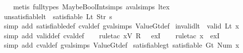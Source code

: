 \begin{isabellebody}
\ \ \isamarkupfalse%
\ {\isacharparenleft}metis\ {\isacharparenleft}full{\isacharunderscore}types{\isacharparenright}\ MaybeBoolInt{\isachardot}simps{\isacharparenleft}{}{\isacharparenright}\ aval{\isachardot}simps{\isacharparenleft}{}{\isacharparenright}\ lt{\isacharunderscore}ex{\isacharparenright}%
\endisatagproof
{\isafoldproof}%
%
\isadelimproof
\isanewline
%
\endisadelimproof
\isanewline
{}\isamarkupfalse%
\ unsatisfiable{\isacharunderscore}lt{\isacharcolon}\ {\isachardoublequoteopen}{\isasymnot}\ satisfiable\ {\isacharparenleft}Lt\ {\isacharparenleft}Str\ s{\isacharparenright}{\isacharparenright}{\isachardoublequoteclose}\isanewline
%
\isadelimproof
\ \ %
\endisadelimproof
%
\isatagproof
{}\isamarkupfalse%
\ {\isacharparenleft}simp\ add{\isacharcolon}\ satisfiable{\isacharunderscore}def\ cval{\isacharunderscore}def\ gval{\isachardot}simps\ ValueGt{\isacharunderscore}def{\isacharparenright}%
\endisatagproof
{\isafoldproof}%
%
\isadelimproof
\isanewline
%
\endisadelimproof
\isanewline
{}\isamarkupfalse%
\ invalid{\isacharunderscore}lt{\isacharcolon}\ {\isachardoublequoteopen}{\isasymnot}\ valid\ {\isacharparenleft}Lt\ x{\isacharparenright}{\isachardoublequoteclose}\isanewline
%
\isadelimproof
\ \ %
\endisadelimproof
%
\isatagproof
{}\isamarkupfalse%
\ {\isacharparenleft}simp\ add{\isacharcolon}\ valid{\isacharunderscore}def\ cval{\isacharunderscore}def{\isacharparenright}\isanewline
\ \ \isamarkupfalse%
\ {\isacharparenleft}rule{\isacharunderscore}tac\ x{\isacharequal}{\isachardoublequoteopen}V\ {\isacharparenleft}R\ {}{\isacharparenright}{\isachardoublequoteclose}\ \ exI{\isacharparenright}\isanewline
\ \ \isamarkupfalse%
\ {\isacharparenleft}rule{\isacharunderscore}tac\ x{\isacharequal}{\isachardoublequoteopen}{\isacharless}{\isachargreater}{\isachardoublequoteclose}\ \ exI{\isacharparenright}\isanewline
\ \ \isamarkupfalse%
\ {\isacharparenleft}simp\ add{\isacharcolon}\ cval{\isacharunderscore}def\ gval{\isachardot}simps\ ValueGt{\isacharunderscore}def{\isacharparenright}%
\endisatagproof
{\isafoldproof}%
%
\isadelimproof
\isanewline
%
\endisadelimproof
\isanewline
{}\isamarkupfalse%
\ satisfiable{\isacharunderscore}gt{\isacharcolon}\ {\isachardoublequoteopen}satisfiable\ {\isacharparenleft}Gt\ {\isacharparenleft}Num\ x{}{\isacharparenright}{\isacharparenright}{\isachardoublequoteclose}\isanewline
%
\isadelimproof
\ \ %
\endisadelimproof

\end{isabellebody}
